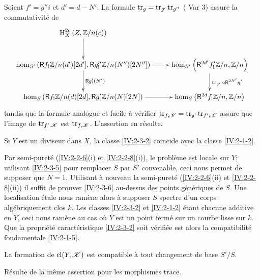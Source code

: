 Soient $f'=g'' i$ et $d'=d-N'$. La formule $\operatorname{tr}_g=\operatorname{tr}_{g'}\operatorname{tr}_{g''}$ 
(\cite[XVIII.2.9]{sga4} Var 3) assure la commutativit\'e de 
\[\xymatrix{
  \h_X^{2 c}\left(Z,\dZ/n(c)\right) \ar[d] \\
  \hom_{S'}\left(\R f_!\dZ/n(d')[2 d'],\R g_!''\dZ/n(N'')[2 N'']\right) \ar[r] \ar[d]^-{\R g_!'(N')} 
    & \hom_{S'}\left(\R^{2 d'} f_!' \dZ/n,\dZ/n\right) \ar[d]^-{\tr_{g'}\circ \R^{2 N'} g_!'} \\
  \hom_S\left(\R f_!\dZ/n(d)[2d],\R g_!'\dZ/n(N)[2 N]\right) \ar[r] 
    & \hom_S\left(\R^{2 d} f_!\dZ/n,\dZ/n\right)
}\]
tandis que la formule analogue et facile \`a v\'erifier 
$\operatorname{tr}_{f,\mathscr{K}}=\operatorname{tr}_{g'}\operatorname{tr}_{f',\mathscr{K}}$ assure que l'image de $\operatorname{tr}_{f',\mathscr{K}}$ est 
$\operatorname{tr}_{f,\mathscr{K}}$. L'assertion en r\'esulte. 





\begin{lemma}\label{IV:2-3-6}
Si $Y$ est un diviseur dans $X$, la classe \ref{IV:2-3-2} coincide avec la 
classe \ref{IV:2-1-2}. 
\end{lemma}

Par semi-puret\'e (\ref{IV:2-2-6}(i) et \ref{IV:2-2-8}(i)), le probl\`eme est 
locale sur $Y$; utilisant \ref{IV:2-3-5} pour remplacer $S$ par $S'$ 
convenable, ceci nous permet de supposer que $N=1$. Utilisant \`a nouveau la 
semi-puret\'e (\ref{IV:2-2-6}(ii) et \ref{IV:2-2-8}(ii)) il suffit de prouver 
\ref{IV:2-3-6} au-dessus des points g\'en\'eriques de $S$. Une localisation 
\'etale nous ram\`ene alors \`a supposer $S$ spectre d'un corps 
alg\'ebriquement clos $k$. Les classes \ref{IV:2-3-2} et \ref{IV:2-1-2} \'etant 
chacune additive en $Y$, ceci nous ram\`ene au cas o\`u $Y$ est un point 
ferm\'e sur un courbe lisse sur $k$. Que la propri\'et\'e caract\'eristique 
\ref{IV:2-3-2} soit v\'erifi\'ee est alors la compatibilit\'e fondamentale 
\ref{IV:2-1-5}. 





\begin{lemma}\label{IV:2-3-7}
La formation de $\operatorname{cl}(Y,\mathscr{K})$ est compatible \`a tout changement de base 
$S'/S$.
\end{lemma}

R\'esulte de la m\^eme assertion pour les morphismes trace.





